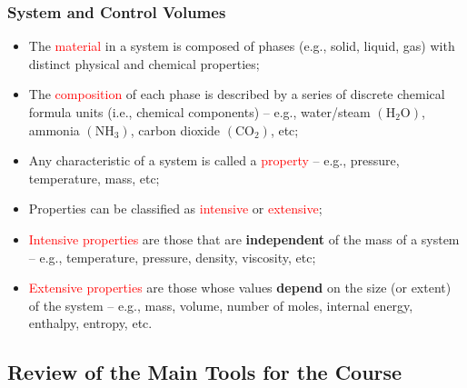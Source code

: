 \documentclass[10pt,compress]{beamer}
\begin{document}
\normalsize


\begin{frame}
 \frametitle{System and Control Volumes}
 \begin{itemize}
  \item <2-> The \textcolor{red}{material} in a system is composed of phases (e.g., solid, liquid, gas) with distinct physical and chemical properties;
  \item <3-> The \textcolor{red}{composition} of each phase is described by a series of discrete chemical formula units (i.e., chemical components) -- e.g., water/steam $\left(\right.$H$_{2}$O$\left.\right)$, ammonia $\left(\right.$NH$_{3}\left.\right)$, carbon dioxide $\left(\right.$CO$_{2}\left.\right)$, etc;
  \item <4-> Any characteristic of a system is called a \textcolor{red}{property} -- e.g., pressure, temperature, mass, etc;
  \item <5-> Properties can be classified as \textcolor{red}{intensive} or \textcolor{red}{extensive};
  \item <6-> \textcolor{red}{Intensive properties} are those that are {\bf independent} of the mass of a system -- e.g., temperature, pressure, density, viscosity, etc;
  \item <7-> \textcolor{red}{Extensive properties} are those whose values {\bf depend} on the size (or extent) of the system -- e.g., mass, volume, number of moles, internal energy, enthalpy, entropy, etc.  
 \end{itemize}
\end{frame}




\subsection{Review of the Main Tools for the Course}
\end{document}
